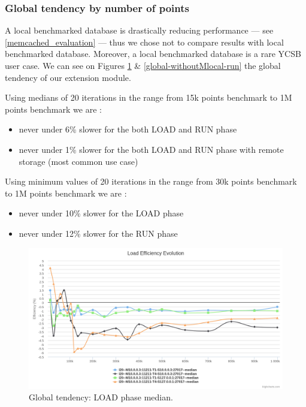 \documentclass[a4paper,11pt]{report}
\begin{document}
\clearpage

\subsubsection{Global tendency by number of points}

A local benchmarked database is drastically reducing performance --- see \ref{memcached_evaluation} --- thus we chose not to compare results with local benchmarked database. Moreover, a local benchmarked database is a rare YCSB user case. We can see on Figures \ref{global-withoutMlocal-load} \&  \ref{global-withoutMlocal-run} the global tendency of our extension module.

Using medians of 20 iterations in the range from 15k points benchmark to 1M points benchmark we are :

\begin{itemize}
\item
never under 6\% slower for the both LOAD and RUN phase
\item
never under 1\% slower for the both LOAD and RUN phase with remote storage (most common use case)
\end{itemize}

Using minimum values of 20 iterations in the range from 30k points benchmark to 1M points benchmark we are :

\begin{itemize}
\item
never under 10\% slower for the LOAD phase
\item
never under 12\% slower for the RUN phase
\end{itemize}

\begin{figure}[ht]
\begin{center}
\includegraphics[width=1\linewidth]{images/evaluation/global-withoutMlocal-load.png}
\caption{Global tendency: LOAD phase median.}
\label{global-withoutMlocal-load}
\end{center}
\end{figure}
\end{document}
